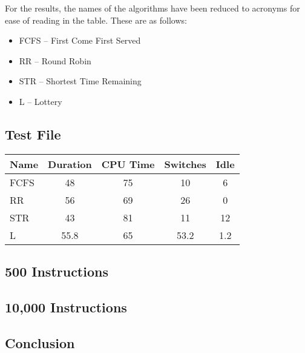 \documentclass{acm_proc_article-sp}
\begin{document}
For the results, the names of the algorithms have been reduced to acronyms for ease of reading in the table. These are as follows:

\begin{itemize}
  \item FCFS -- First Come First Served
  \item RR -- Round Robin
  \item STR -- Shortest Time Remaining
  \item L -- Lottery
\end{itemize}

\subsection{Test File}


\begin{tabular}{| l | c | c | c | c |}
  \hline
  Name & Duration & CPU Time & Switches &  Idle \\
  \hline
  FCFS & 48 & 75 & 10 & 6 \\
  RR & 56 & 69 & 26 & 0 \\
  STR & 43 & 81 & 11 & 12 \\
  L & 55.8 & 65 & 53.2 & 1.2 \\
  \hline
\end{tabular}


\subsection{500 Instructions}

\subsection{10,000 Instructions}


\subsection{Conclusion}
\end{document}
